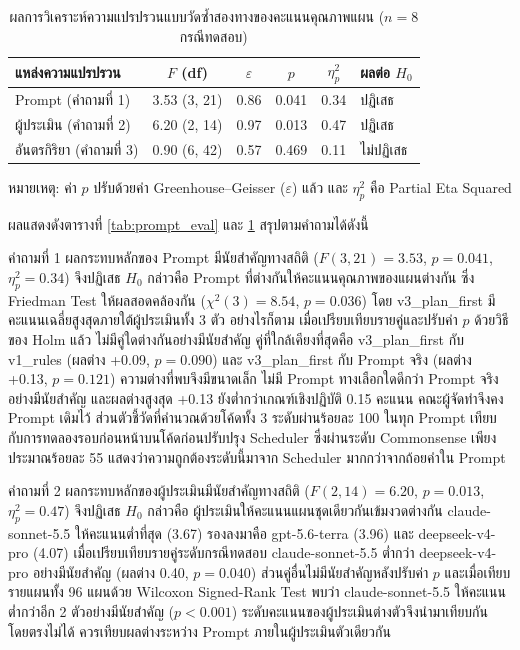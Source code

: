 \begin{table}[H]
\centering
\caption{ผลการวิเคราะห์ความแปรปรวนแบบวัดซ้ำสองทางของคะแนนคุณภาพแผน ($n = 8$ กรณีทดสอบ)}
\label{tab:prompt_hyp}
\begin{tabular}{|p{4.9cm}|c|c|c|c|p{1.8cm}|}
\hline
\textbf{แหล่งความแปรปรวน} & \textbf{$F$ (df)} & \textbf{$\varepsilon$} & \textbf{$p$} & \textbf{$\eta^2_p$} & \textbf{ผลต่อ $H_0$} \\
\hline
Prompt (คำถามที่ 1) & 3.53 (3, 21) & 0.86 & 0.041 & 0.34 & ปฏิเสธ \\ \hline
ผู้ประเมิน (คำถามที่ 2) & 6.20 (2, 14) & 0.97 & 0.013 & 0.47 & ปฏิเสธ \\ \hline
อันตรกิริยา (คำถามที่ 3) & 0.90 (6, 42) & 0.57 & 0.469 & 0.11 & ไม่ปฏิเสธ \\
\hline
\end{tabular}
\par\smallskip
{\small หมายเหตุ: ค่า $p$ ปรับด้วยค่า Greenhouse--Geisser ($\varepsilon$) แล้ว และ $\eta^2_p$ คือ Partial Eta Squared}
\end{table}

ผลแสดงดังตารางที่ \ref{tab:prompt_eval} และ \ref{tab:prompt_hyp} สรุปตามคำถามได้ดังนี้

คำถามที่ 1 ผลกระทบหลักของ Prompt มีนัยสำคัญทางสถิติ ($F(3, 21) = 3.53$, $p = 0.041$, $\eta^2_p = 0.34$) จึงปฏิเสธ $H_0$ กล่าวคือ Prompt ที่ต่างกันให้คะแนนคุณภาพของแผนต่างกัน ซึ่ง Friedman Test ให้ผลสอดคล้องกัน ($\chi^2(3) = 8.54$, $p = 0.036$) โดย v3\_plan\_first มีคะแนนเฉลี่ยสูงสุดภายใต้ผู้ประเมินทั้ง 3 ตัว อย่างไรก็ตาม เมื่อเปรียบเทียบรายคู่และปรับค่า $p$ ด้วยวิธีของ Holm แล้ว ไม่มีคู่ใดต่างกันอย่างมีนัยสำคัญ คู่ที่ใกล้เคียงที่สุดคือ v3\_plan\_first กับ v1\_rules (ผลต่าง +0.09, $p = 0.090$) และ v3\_plan\_first กับ Prompt จริง (ผลต่าง +0.13, $p = 0.121$) ความต่างที่พบจึงมีขนาดเล็ก ไม่มี Prompt ทางเลือกใดดีกว่า Prompt จริงอย่างมีนัยสำคัญ และผลต่างสูงสุด +0.13 ยังต่ำกว่าเกณฑ์เชิงปฏิบัติ 0.15 คะแนน คณะผู้จัดทำจึงคง Prompt เดิมไว้ ส่วนตัวชี้วัดที่คำนวณด้วยโค้ดทั้ง 3 ระดับผ่านร้อยละ 100 ในทุก Prompt เทียบกับการทดลองรอบก่อนหน้าบนโค้ดก่อนปรับปรุง Scheduler ซึ่งผ่านระดับ Commonsense เพียงประมาณร้อยละ 55 แสดงว่าความถูกต้องระดับนี้มาจาก Scheduler มากกว่าจากถ้อยคำใน Prompt

คำถามที่ 2 ผลกระทบหลักของผู้ประเมินมีนัยสำคัญทางสถิติ ($F(2, 14) = 6.20$, $p = 0.013$, $\eta^2_p = 0.47$) จึงปฏิเสธ $H_0$ กล่าวคือ ผู้ประเมินให้คะแนนแผนชุดเดียวกันเข้มงวดต่างกัน claude-sonnet-5.5 ให้คะแนนต่ำที่สุด (3.67) รองลงมาคือ gpt-5.6-terra (3.96) และ deepseek-v4-pro (4.07) เมื่อเปรียบเทียบรายคู่ระดับกรณีทดสอบ claude-sonnet-5.5 ต่ำกว่า deepseek-v4-pro อย่างมีนัยสำคัญ (ผลต่าง 0.40, $p = 0.040$) ส่วนคู่อื่นไม่มีนัยสำคัญหลังปรับค่า $p$ และเมื่อเทียบรายแผนทั้ง 96 แผนด้วย Wilcoxon Signed-Rank Test พบว่า claude-sonnet-5.5 ให้คะแนนต่ำกว่าอีก 2 ตัวอย่างมีนัยสำคัญ ($p < 0.001$) ระดับคะแนนของผู้ประเมินต่างตัวจึงนำมาเทียบกันโดยตรงไม่ได้ ควรเทียบผลต่างระหว่าง Prompt ภายในผู้ประเมินตัวเดียวกัน

